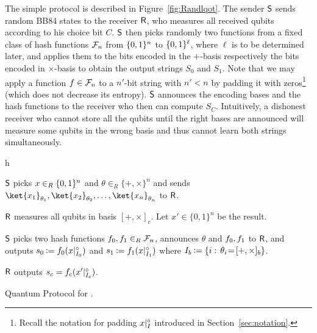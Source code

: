 The simple protocol is described in Figure~\ref{fig:Randlqot}.  
The sender $\S$ sends random BB84 states to the receiver $\R$, who
measures all received qubits according to his choice bit $C$. $\S$
then picks randomly two functions from a fixed 
 \univ class of hash
functions $\chf{n}$ from $\set{0,1}^n$ to $\set{0,1}^{\ell}$, where $\ell$
is to be determined later, and applies them to the bits encoded in the
$+$-basis respectively the bits encoded in $\times$-basis to obtain the
output strings $S_0$ and $S_1$. Note that we may apply a function $\hf
\in \chf{n}$ to a $n'$-bit string with $n' < n$ by padding it with
zeros\footnote{Recall the notation for padding $x \pad_I$ introduced
  in Section~\ref{sec:notation}.}
(which does not decrease its entropy).
$\S$ announces the encoding bases and the hash
functions to the receiver who then can compute $S_C$. Intuitively, a
dishonest receiver who cannot store all the qubits until the right
bases are announced will measure some qubits in the wrong basis and thus cannot learn both strings simultaneously.  

\begin{myfigure}{h}
\begin{myprotocol}{\Randlqot}
\item $\S$ picks $x \in_R \nbit$ and $\theta \in_R \{+,\times \}^n$ 
and sends $\ket{x_1}_{\theta_1},
   \ket{x_2}_{\theta_2}, \ldots, \ket{x_n}_{\theta_n}$ to $\R$. 
\item $\R$ measures all qubits in basis $[+,\times]_{c}$. %
Let $x' \in \{0,1\}^n$ be the result.
\item $\S$ picks two hash functions $\hf_0,\hf_1 \in_R \chf{n}$,
  announces $\theta$ and $\hf_0, \hf_1$ to $\R$, and outputs $s_0
  \assign \hf_0(x \pad_{I_0})$ and $s_1 \assign \hf_1(x \pad_{I_1})$ where
  $I_b \assign \Set{i}{\theta_i \!=\! [+,\times]_b}$. \label{bound12}
\item $\R$ outputs $s_{c} = \hf_{c}(x' \pad_{I_{c}})$.
\end{myprotocol}
\caption{Quantum Protocol for \boldmath\RandlStringOT.}\label{fig:Randlqot}
\end{myfigure}

